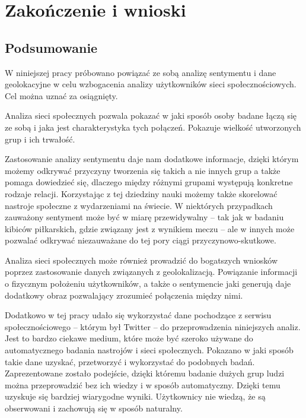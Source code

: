 \chapter{Zakończenie i wnioski}
\section{Podsumowanie}

W niniejszej pracy próbowano powiązać ze sobą analizę sentymentu i dane
geolokacyjne w celu wzbogacenia analizy użytkowników sieci społecznościowych.
Cel można uznać za osiągnięty.

Analiza sieci społecznych pozwala pokazać w jaki sposób osoby badane łączą się
ze sobą i jaka jest charakterystyka tych połączeń. Pokazuje wielkość
utworzonych grup i ich trwałość.

Zastosowanie analizy sentymentu daje nam dodatkowe informacje, dzięki którym
możemy odkrywać przyczyny tworzenia się takich a nie innych grup
a także pomaga dowiedzieć się, dlaczego między różnymi grupami występują
konkretne rodzaje relacji. Korzystając z tej dziedziny nauki możemy także
skorelować nastroje społeczne z wydarzeniami na świecie. W niektórych przypadkach
zauważony sentyment może być w miarę przewidywalny -- tak jak w badaniu 
kibiców piłkarskich, gdzie związany jest z wynikiem meczu -- ale w innych
może pozwalać odkrywać niezauważane do tej pory ciągi przyczynowo-skutkowe.

Analiza sieci społecznych może również prowadzić do bogatszych wniosków
poprzez zastosowanie danych związanych z geolokalizacją. Powiązanie informacji
o fizycznym położeniu użytkowników, a także o sentymencie jaki generują
daje dodatkowy obraz pozwalający zrozumieć połączenia między nimi.

Dodatkowo w tej pracy udało się wykorzystać dane pochodzące z serwisu 
społecznościowego -- którym był Twitter -- do przeprowadzenia niniejszych
analiz.
Jest to bardzo ciekawe medium, które może być szeroko używane do automatycznego
badania nastrojów i sieci społecznych. Pokazano w jaki sposób takie dane
uzyskać, przetworzyć i wykorzystać do podobnych badań. Zaprezentowane zostało podejście,
dzięki któremu badanie dużych grup ludzi można przeprowadzić bez ich wiedzy
i w sposób automatyczny. Dzięki temu uzyskuje się bardziej wiarygodne wyniki.
Użytkownicy nie wiedzą, że są obserwowani i zachowują się w sposób naturalny.


